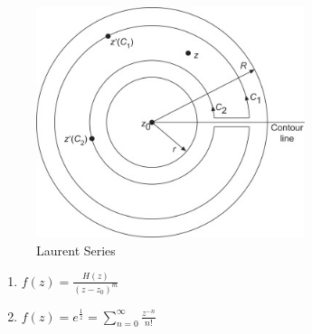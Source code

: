 \begin{figure}[h!]
    \centering
    \includegraphics[width=0.7\textwidth]{LECTURE_10/laurent-series.jpg}
    \caption{Laurent Series}
    \label{fig:laurent_series}
\end{figure}

\begin{example}
    \begin{enumerate}
        \item $f(z) = \frac{H(z)}{(z - z_0)^m}$
        \item $f(z) = e^\frac{1}{z} = \sum_{n=0}^{\infty} \frac{z^{-n}}{n!}$
    \end{enumerate}
\end{example}